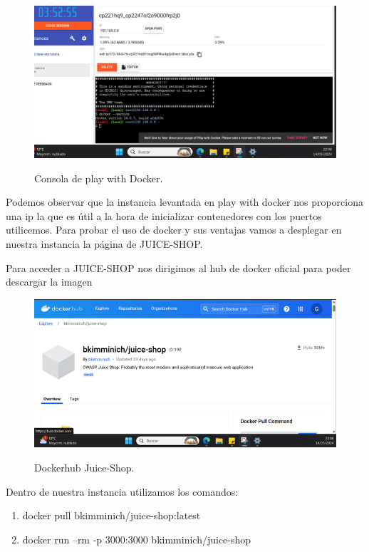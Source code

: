 \documentclass[stu, 11pt, letterpaper, donotrepeattitle, floatsintext, natbib]{apa7}
\begin{document}
\begin{figure}[H]
    \centering
    \caption{Consola de play with Docker.}
    \includegraphics[width=0.75\linewidth]{docker3.png} %
    \label{fig:OverallEffect}
\end{figure}

Podemos observar que la instancia levantada en play with docker nos proporciona una ip la que es útil a la hora de inicializar contenedores con los puertos utilicemos. 
Para probar el uso de docker y sus ventajas vamos a desplegar en nuestra instancia la página de JUICE-SHOP. 

Para acceder a JUICE-SHOP nos dirigimos al hub de docker oficial para poder descargar la imagen

\begin{figure}[H]
    \centering
    \caption{Dockerhub Juice-Shop.}
    \includegraphics[width=0.75\linewidth]{docker4.png} %
    \label{fig:OverallEffect}
\end{figure}

Dentro de nuestra instancia utilizamos los comandos:

\begin{enumerate}
  \item docker pull bkimminich/juice-shop:latest
  \item  docker run --rm -p 3000:3000 bkimminich/juice-shop
\end{enumerate}
\end{document}
